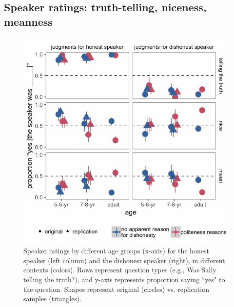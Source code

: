 \documentclass[oneside]{report}
\begin{document}
\subsection{Speaker ratings: truth-telling, niceness,
meanness}\label{speaker-ratings-truth-telling-niceness-meanness}
\begin{figure}[p]

{\centering \includegraphics[width=0.9\linewidth]{erica_yoon_dissertation_files/figure-latex/figTrupolResultsPlacement-1} 

}

\caption[Speaker ratings for the experiment in Chapter 3.]{Speaker ratings by different age groups (x-axis) for the honest speaker (left column) and the dishonest speaker (right), in different contexts (colors). Rows represent question types (e.g., Was Sally telling the truth?), and y-axis represents proportion saying ``yes" to the question. Shapes represent original (circles) vs. replication samples (triangles). }\label{fig:figTrupolResultsPlacement}
\end{figure}
\end{document}
